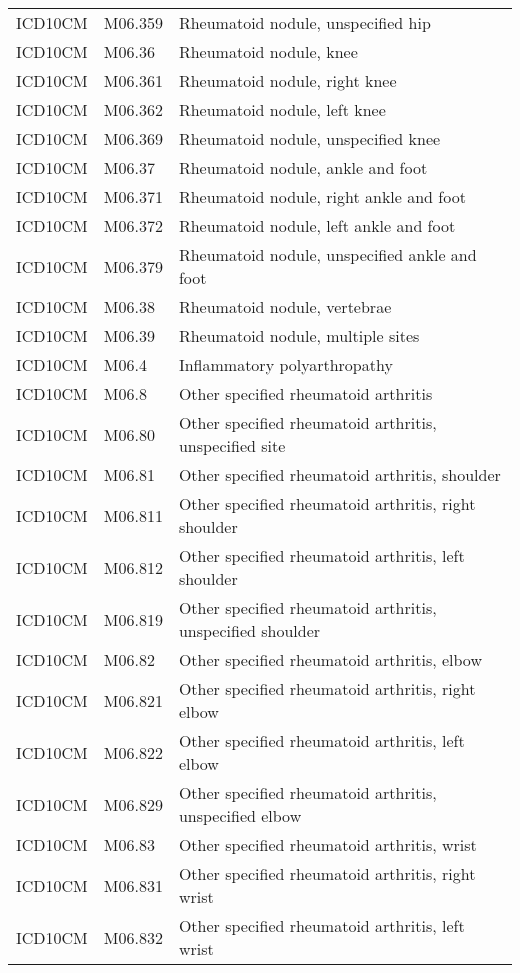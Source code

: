 \begin{table}[ht]
\begin{tabular}{lll}
  ICD10CM & M06.359 & Rheumatoid nodule, unspecified hip \\ 
  ICD10CM & M06.36 & Rheumatoid nodule, knee \\ 
  ICD10CM & M06.361 & Rheumatoid nodule, right knee \\ 
  ICD10CM & M06.362 & Rheumatoid nodule, left knee \\ 
  ICD10CM & M06.369 & Rheumatoid nodule, unspecified knee \\ 
  ICD10CM & M06.37 & Rheumatoid nodule, ankle and foot \\ 
  ICD10CM & M06.371 & Rheumatoid nodule, right ankle and foot \\ 
  ICD10CM & M06.372 & Rheumatoid nodule, left ankle and foot \\ 
  ICD10CM & M06.379 & Rheumatoid nodule, unspecified ankle and foot \\ 
  ICD10CM & M06.38 & Rheumatoid nodule, vertebrae \\ 
  ICD10CM & M06.39 & Rheumatoid nodule, multiple sites \\ 
  ICD10CM & M06.4 & Inflammatory polyarthropathy \\ 
  ICD10CM & M06.8 & Other specified rheumatoid arthritis \\ 
  ICD10CM & M06.80 & Other specified rheumatoid arthritis, unspecified site \\ 
  ICD10CM & M06.81 & Other specified rheumatoid arthritis, shoulder \\ 
  ICD10CM & M06.811 & Other specified rheumatoid arthritis, right shoulder \\ 
  ICD10CM & M06.812 & Other specified rheumatoid arthritis, left shoulder \\ 
  ICD10CM & M06.819 & Other specified rheumatoid arthritis, unspecified shoulder \\ 
  ICD10CM & M06.82 & Other specified rheumatoid arthritis, elbow \\ 
  ICD10CM & M06.821 & Other specified rheumatoid arthritis, right elbow \\ 
  ICD10CM & M06.822 & Other specified rheumatoid arthritis, left elbow \\ 
  ICD10CM & M06.829 & Other specified rheumatoid arthritis, unspecified elbow \\ 
  ICD10CM & M06.83 & Other specified rheumatoid arthritis, wrist \\ 
  ICD10CM & M06.831 & Other specified rheumatoid arthritis, right wrist \\ 
  ICD10CM & M06.832 & Other specified rheumatoid arthritis, left wrist \\ 

\end{tabular}
\end{table}
